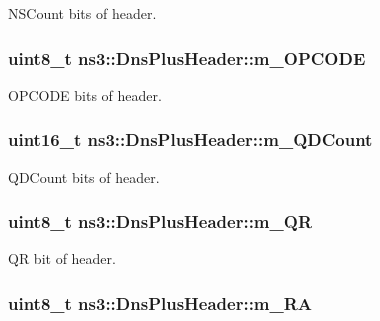 N\-S\-Count bits of header. 

\hypertarget{classns3_1_1DnsPlusHeader_ae93aeff5c9677e5252405cab8323f2df}{
\subsubsection[{m\-\_\-\-O\-P\-C\-O\-D\-E}]{\setlength{\rightskip}{0pt plus 5cm}uint8\-\_\-t ns3\-::\-Dns\-Plus\-Header\-::m\-\_\-\-O\-P\-C\-O\-D\-E\hspace{0.3cm}{\ttfamily [private]}}}\label{classns3_1_1DnsPlusHeader_ae93aeff5c9677e5252405cab8323f2df}


O\-P\-C\-O\-D\-E bits of header. 

\hypertarget{classns3_1_1DnsPlusHeader_ab85daf2b1bc16d2c58d1b6c1e21395d8}{
\subsubsection[{m\-\_\-\-Q\-D\-Count}]{\setlength{\rightskip}{0pt plus 5cm}uint16\-\_\-t ns3\-::\-Dns\-Plus\-Header\-::m\-\_\-\-Q\-D\-Count\hspace{0.3cm}{\ttfamily [private]}}}\label{classns3_1_1DnsPlusHeader_ab85daf2b1bc16d2c58d1b6c1e21395d8}


Q\-D\-Count bits of header. 

\hypertarget{classns3_1_1DnsPlusHeader_a913492faf18c9740d1a4db2e7b056b54}{
\subsubsection[{m\-\_\-\-Q\-R}]{\setlength{\rightskip}{0pt plus 5cm}uint8\-\_\-t ns3\-::\-Dns\-Plus\-Header\-::m\-\_\-\-Q\-R\hspace{0.3cm}{\ttfamily [private]}}}\label{classns3_1_1DnsPlusHeader_a913492faf18c9740d1a4db2e7b056b54}


Q\-R bit of header. 

\hypertarget{classns3_1_1DnsPlusHeader_a275459d7076136ce2c7099734b264cd5}{
\subsubsection[{m\-\_\-\-R\-A}]{\setlength{\rightskip}{0pt plus 5cm}uint8\-\_\-t ns3\-::\-Dns\-Plus\-Header\-::m\-\_\-\-R\-A\hspace{0.3cm}{\ttfamily [private]}}}\label{classns3_1_1DnsPlusHeader_a275459d7076136ce2c7099734b264cd5}


